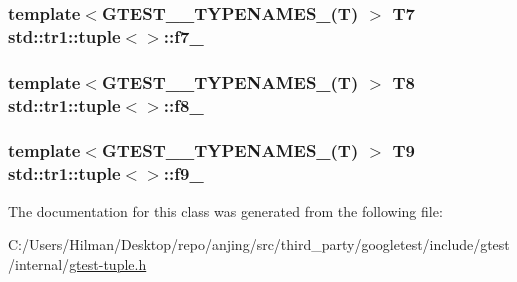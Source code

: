 \subsubsection[{f7\+\_\+}]{\setlength{\rightskip}{0pt plus 5cm}template$<$G\+T\+E\+S\+T\+\_\+\_\+\+T\+Y\+P\+E\+N\+A\+M\+E\+S\+\_\+(\+T) $>$ T7 {\bf std\+::tr1\+::tuple}$<$$>$\+::f7\+\_\+}\label{classstd_1_1tr1_1_1tuple_a7c28780e616d382833e844f62672c6bc}
\hypertarget{classstd_1_1tr1_1_1tuple_ae859012c83943e54e035a4a32089ccb6}{}
\subsubsection[{f8\+\_\+}]{\setlength{\rightskip}{0pt plus 5cm}template$<$G\+T\+E\+S\+T\+\_\+\_\+\+T\+Y\+P\+E\+N\+A\+M\+E\+S\+\_\+(\+T) $>$ T8 {\bf std\+::tr1\+::tuple}$<$$>$\+::f8\+\_\+}\label{classstd_1_1tr1_1_1tuple_ae859012c83943e54e035a4a32089ccb6}
\hypertarget{classstd_1_1tr1_1_1tuple_a336d5e582fd34e45ec88c78d473671dd}{}
\subsubsection[{f9\+\_\+}]{\setlength{\rightskip}{0pt plus 5cm}template$<$G\+T\+E\+S\+T\+\_\+\_\+\+T\+Y\+P\+E\+N\+A\+M\+E\+S\+\_\+(\+T) $>$ T9 {\bf std\+::tr1\+::tuple}$<$$>$\+::f9\+\_\+}\label{classstd_1_1tr1_1_1tuple_a336d5e582fd34e45ec88c78d473671dd}


The documentation for this class was generated from the following file\+:\begin{DoxyCompactItemize}
\item 
C\+:/\+Users/\+Hilman/\+Desktop/repo/anjing/src/third\+\_\+party/googletest/include/gtest/internal/\hyperlink{gtest-tuple_8h}{gtest-\/tuple.\+h}\end{DoxyCompactItemize}
